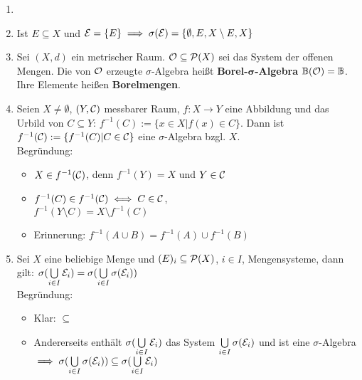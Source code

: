\documentclass[11pt,a4paper,fleqn,openany]{report}
\begin{document}
    \begin{example}
      \begin{enumerate}
        \item[]
        \item Ist $E \subseteq X$ und $\mathcal{E} = \{E\} \implies \sigma(\mathcal{E}) = \{\emptyset, E, X \setminus E, X\}$
        \item Sei $(X,d)$ ein metrischer Raum. $\mathcal{O} \subseteq \mathcal{P}(X)$ sei das System der offenen Mengen. Die von $\mathcal{O}$ erzeugte $\sigma$-Algebra heißt \textbf{Borel-$\bm{\sigma}$-Algebra} $\mathbb{B} (\mathcal{O})=\mathbb{B}$. Ihre Elemente heißen \textbf{Borelmengen}.
        \item Seien $X \neq \emptyset$, $(Y, \mathcal{C})$ messbarer Raum, $f:X \to Y$ eine Abbildung und das Urbild von $C \subseteq Y$: $f^{-1}(C) := \{x \in X|f(x) \in C\}$. Dann ist $f^{-1}(\mathcal{C}):=\{f^{-1}(C)|C \in \mathcal{C}\}$ eine $\sigma$-Algebra bzgl. $X$.\\
              Begründung: 
              \begin{itemize}
                \item $X \in f^{-1}(\mathcal{C})$, denn $f^{-1}(Y) = X$ und $Y \in \mathcal{C}$
                \item $f^{-1}(C) \in f^{-1}(\mathcal{C}) \iff C \in \mathcal{C}$,\\$f^{-1}(Y \setminus C) = X \setminus f^{-1}(C)$
                \item Erinnerung: $f^{-1}(A \cup B) = f^{-1}(A) \cup f^{-1}(B)$
              \end{itemize}
        \item Sei $X$ eine beliebige Menge und $\mathcal{(}E)_i \subseteq \mathcal{P}(X)$, $i \in I$, Mengensysteme, dann gilt: $\sigma(\bigcup\limits_{i \in I} \mathcal{E}_i) = \sigma(\bigcup\limits_{i \in I} \sigma(\mathcal{E}_i))$\\
              Begründung:
              \begin{itemize}
                \item Klar: $\subseteq$
                \item Andererseits enthält $\sigma(\bigcup\limits_{i \in I} \mathcal{E}_i)$ das System $\bigcup\limits_{i \in I} \sigma (\mathcal{E}_i)$ und ist eine $\sigma$-Algebra $\implies \sigma(\bigcup\limits_{i \in I} \sigma(\mathcal{E}_i)) \subseteq \sigma(\bigcup\limits_{i \in I} \mathcal{E}_i)$
              \end{itemize}
      \end{enumerate}
    \end{example}
\end{document}
